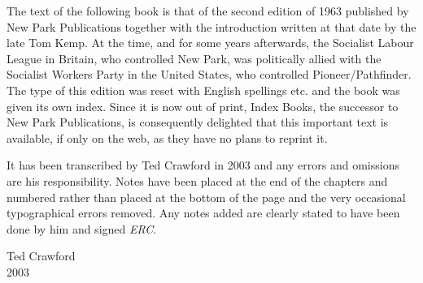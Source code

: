 The text of the following book is that of the second edition of 1963 published by New Park Publications together with the introduction written at that date by the late Tom Kemp. At the time, and for some years afterwards, the Socialist Labour League in Britain, who controlled New Park, was politically allied with the Socialist Workers Party in the United States, who controlled Pioneer/Pathfinder. The type of this edition was reset with English spellings etc. and the book was given its own index. Since it is now out of print, Index Books, the successor to New Park Publications, is consequently delighted that this important text is available, if only on the web, as they have no plans to reprint it.

It has been transcribed by Ted Crawford in 2003 and any errors and omissions are his responsibility. Notes have been placed at the end of the chapters and numbered rather than placed at the bottom of the page and the very occasional typographical errors removed. Any notes added are clearly stated to have been done by him and signed \emph{ERC}.

\begin{flushright}
Ted Crawford \\
2003
\end{flushright}
